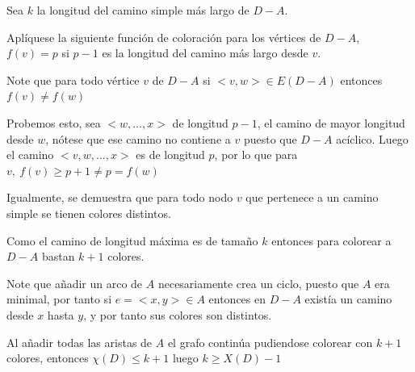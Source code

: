 \documentclass[a4paper,1pt]{report}
\begin{document}
Sea $k$ la longitud del camino simple más largo de $D-A$.

Aplíquese la siguiente función de coloración  para los vértices de $D-A$, $f(v)=p$ si $p-1$ es la longitud del camino más largo desde $v$.

Note que para todo vértice $v$ de $D-A$ si $<v,w>\in E(D-A)$ entonces $f(v)\neq f(w)$

Probemos esto, sea $<w,\dots,x>$ de longitud $p-1$, el camino de mayor longitud  desde $w$, n\'otese que ese camino no contiene a $v$ puesto que $D-A$ ac\'iclico.
Luego el camino $<v,w,\dots,x>$ es de longitud $p$, por lo que para $v, \ f(v) \geq p + 1 \neq p = f(w)$ 


Igualmente, se demuestra que para todo nodo $v$ que pertenece a un camino simple se tienen colores distintos.

Como el camino de longitud máxima es de tamaño $k$ entonces para colorear a  $D-A$ bastan $k+1$ colores.

Note que añadir un arco de $A$ necesariamente crea un ciclo, puesto que $A$ era minimal, por tanto si $e=<x,y> \in A$ entonces en $D-A$ existía un camino desde $x$ hasta  $y$, y por tanto sus colores son distintos.

Al añadir todas las aristas de $A$ el grafo continúa pudiendose colorear con $k+1$ colores, entonces $\chi(D)\leq k+1$  luego $k\geq X(D)-1$
  
\end{document}
